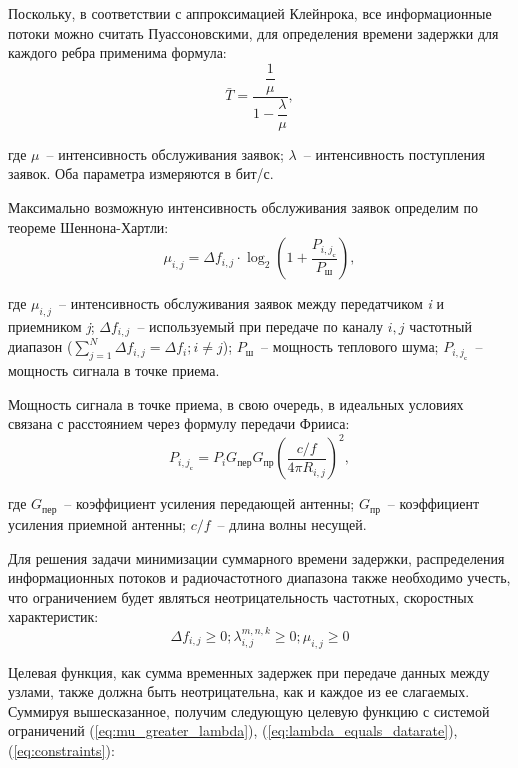 \documentclass[14pt,a4paper,titlepage]{extarticle}
\begin{document}
Поскольку, в соответствии с аппроксимацией Клейнрока, все информационные потоки можно считать Пуассоновскими, для определения времени задержки для каждого ребра применима формула:
\begin{equation}
\bar{T} = \dfrac{\dfrac{1}{\mu}}{1-\dfrac{\lambda}{\mu}},
\end{equation}

где $\mu$~-- интенсивность обслуживания заявок; $\lambda$~-- интенсивность поступления заявок. Оба параметра измеряются в бит/с.

Максимально возможную интенсивность обслуживания заявок определим по теореме Шеннона-Хартли:
\begin{equation}
\mu_{i,j} = \Delta f_{i,j} \cdot \log_2\left(1 + \dfrac{P_{i,j_{\text{с}}}}{P_{\text{ш}}}\right),
\end{equation}

где $\mu_{i,j}$~-- интенсивность обслуживания заявок между передатчиком \textit{i} и приемником \textit{j}; $\Delta f_{i,j}$~-- используемый при передаче по каналу $i,j$ частотный диапазон ($\sum\limits_{j=1}^N \Delta f_{i,j} = \Delta f_{i}; i \neq j $); $P_{\text{ш}}$~-- мощность теплового шума; $P_{i,j_{\text{с}}}$~-- мощность сигнала в точке приема.

Мощность сигнала в точке приема, в свою очередь, в идеальных условиях связана с расстоянием через формулу передачи Фрииса:
\begin{equation}
\label{eq:friis}
P_{i,j_{\text{с}}} = P_i G_{\textit{пер}} G_{\textit{пр}} \left(\dfrac{c\slash f}{4 \pi R_{i,j}}\right)^2,
\end{equation}

где $G_{\textit{пер}}$~-- коэффициент усиления передающей антенны; $G_{\textit{пр}}$~-- коэффициент усиления приемной антенны; $c\slash f$~-- длина волны несущей.

Для решения задачи минимизации суммарного времени задержки, распределения информационных потоков и радиочастотного диапазона также необходимо учесть, что ограничением будет являться неотрицательность частотных, скоростных характеристик:
\begin{equation}
\label{eq:constraints}
\Delta f_{i,j} \geq 0; \lambda_{i,j}^{m,n,k} \geq 0;  \mu_{i,j} \geq 0 
\end{equation}

Целевая функция, как сумма временных задержек при передаче данных между узлами, также должна быть неотрицательна, как и каждое из ее слагаемых. Суммируя вышесказанное, получим следующую целевую функцию с системой ограничений (\ref{eq:mu_greater_lambda}), (\ref{eq:lambda_equals_datarate}), (\ref{eq:constraints}):
\end{document}

